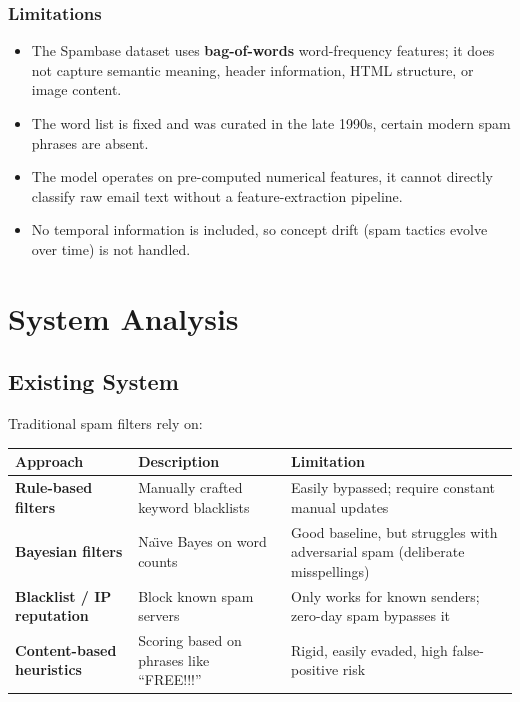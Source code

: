 \documentclass[12pt, a4paper]{article}
\begin{document}
\subsubsection*{Limitations}
\begin{itemize}
    \item The Spambase dataset uses \textbf{bag-of-words} word-frequency features; it does not capture semantic meaning, header information, HTML structure, or image content.
    \item The word list is fixed and was curated in the late 1990s, certain modern spam phrases are absent.
    \item The model operates on pre-computed numerical features, it cannot directly classify raw email text without a feature-extraction pipeline.
    \item No temporal information is included, so concept drift (spam tactics evolve over time) is not handled.
\end{itemize}

\section{System Analysis}

\subsection{Existing System}
Traditional spam filters rely on:

\begin{table}[h]
\centering
\begin{tabular}{|l|p{4cm}|p{6cm}|}
\hline
\textbf{Approach} & \textbf{Description} & \textbf{Limitation} \\ \hline
\textbf{Rule-based filters} & Manually crafted keyword blacklists & Easily bypassed; require constant manual updates \\ \hline
\textbf{Bayesian filters} & Na\"{\i}ve Bayes on word counts & Good baseline, but struggles with adversarial spam (deliberate misspellings) \\ \hline
\textbf{Blacklist / IP reputation} & Block known spam servers & Only works for known senders; zero-day spam bypasses it \\ \hline
\textbf{Content-based heuristics} & Scoring based on phrases like ``FREE!!!'' & Rigid, easily evaded, high false-positive risk \\ \hline
\end{tabular}
\end{table}
\end{document}
